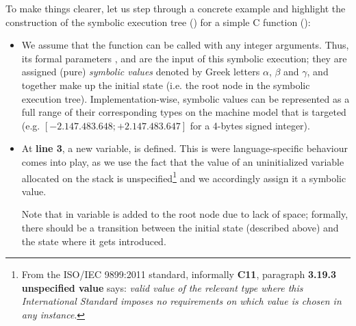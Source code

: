 To make things clearer, let us step through a concrete example and highlight
the construction of the symbolic execution tree
() for a simple C function
():
\begin{itemize}
  \newcommand{\pa}{\hltexttt{a}}
  \newcommand{\pb}{\hltexttt{b}}
  \newcommand{\pc}{\hltexttt{c}}
  \newcommand{\vmax}{\hltexttt{max}}

  \item We assume that the  function can be called with any
    integer arguments.  Thus, its formal parameters \pa{}, \pb{} and \pc{} are
    the input of this symbolic execution; they are assigned (pure)
    \emph{symbolic values} denoted by Greek letters $\alpha$, $\beta$ and
    $\gamma$, and together make up the initial state (i.e. the root node in the
    symbolic execution tree).  Implementation-wise, symbolic values can be
    represented as a full range of their corresponding types on the machine
    model that is targeted (e.g. $[-2.147.483.648; +2.147.483.647]$ for a
    4-bytes signed integer).

  \item At \textbf{line 3}, a new variable, \vmax{} is defined.  This is were
    language-specific behaviour comes into play, as we use the fact that the
    value of an uninitialized variable allocated on the stack is
    unspecified\footnote{From the ISO/IEC 9899:2011 standard, informally
    \textbf{C11}, paragraph \textbf{3.19.3 unspecified value} says: \emph{valid
    value of the relevant type where this International Standard imposes no
    requirements on which value is chosen in any instance}.} and we accordingly
    assign it a symbolic value.

    Note that in  variable \vmax{} is
    added to the root node due to lack of space; formally, there should be a
    transition between the initial state (described above) and the state where
    it gets introduced.


\end{itemize}
